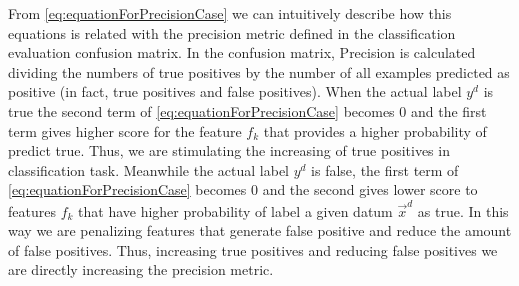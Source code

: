 \documentclass{article}
\begin{document}
From \eqref{eq:equationForPrecisionCase} we can intuitively describe how this equations is related with the precision metric defined in the classification evaluation confusion matrix. In the confusion matrix, Precision is calculated dividing the numbers of true positives by the number of all examples predicted as positive (in fact, true positives and false positives). When the actual label $y^d$ is true the second term of \eqref{eq:equationForPrecisionCase} becomes 0 and the first term gives higher score for the feature $f_k$ that provides a higher probability of predict true. Thus, we are stimulating the increasing of true positives in classification task. Meanwhile the actual label $y^d$ is false, the first term of \eqref{eq:equationForPrecisionCase} becomes 0 and the second gives lower score to features $f_k$ that have higher probability of label a given datum $\vec{x}^d$ as true. In this way we are penalizing features that generate false positive and reduce the amount of false positives. Thus, increasing true positives and reducing  false positives we are directly increasing the precision metric.
 
\end{document}
